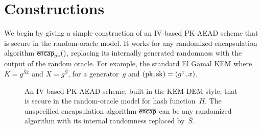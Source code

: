\section{Constructions}
\label{sec:constructions}
We begin by giving a simple construction of an IV-based PK-AEAD scheme that is secure in the random-oracle model. It works for any randomized encapsulation algorithm $\OLencapprim{\pk}{}$, replacing its internally generated randomness with the output of the random oracle.  For example, the standard El Gamal KEM where $K=g^{\overline{S}x}$ and $X=g^{\overline{S}}$, for a generator~$g$ and $(\mathrm{pk},\mathrm{sk})=(g^x,x)$.
%

\begin{figure}
\begin{center}
\caption{An IV-based PK-AEAD scheme, built in the KEM-DEM style, that is secure in the random-oracle model for hash function~$H$. The unspecified encapsulation algorithm $\overline{\mathsf{encap}}$ can be any randomized algorithm with its internal randomness replaced by~$\overline{S}$.
}
\label{fig:ro-kem-dem-construction}
\end{center}
\end{figure}


